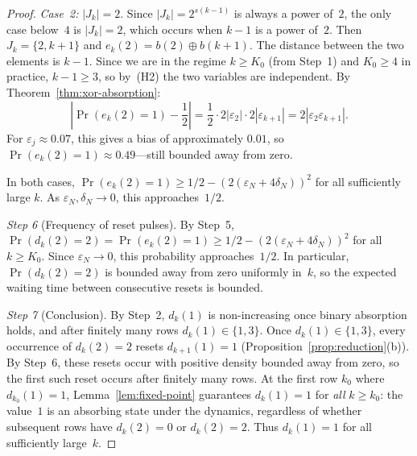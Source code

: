\documentclass[11pt, a4paper]{amsart}
\theoremstyle{plain}
\theoremstyle{definition}
\renewcommand{\Pr}{\operatorname{Pr}}
\begin{document}
\begin{proof}
\textit{Case~2:} $|J_k| = 2$. Since $|J_k| = 2^{s(k-1)}$ is always a power of~$2$, the only case
below~$4$ is $|J_k| = 2$, which occurs when $k - 1$ is a power of~$2$. Then $J_k = \{2, k+1\}$
and $e_k(2) = b(2) \oplus b(k+1)$. The distance between the two elements is $k - 1$.
Since we are in the regime $k \ge K_0$ (from Step~1) and $K_0 \ge 4$ in practice,
$k - 1 \ge 3$, so by~(H2) the two variables are independent.
By Theorem~\ref{thm:xor-absorption}:
\[
\left|\Pr(e_k(2) = 1) - \frac{1}{2}\right| = \frac{1}{2} \cdot 2|\varepsilon_2| \cdot 2|\varepsilon_{k+1}| = 2|\varepsilon_2 \varepsilon_{k+1}|.
\]
For $\varepsilon_j \approx 0.07$, this gives a bias of approximately $0.01$, so $\Pr(e_k(2) = 1) \approx 0.49$---still bounded away from zero.

In both cases, $\Pr(e_k(2) = 1) \ge 1/2 - (2(\varepsilon_N + 4\delta_N))^2$ for all sufficiently large $k$. As $\varepsilon_N, \delta_N \to 0$, this approaches~$1/2$.

\textit{Step 6} (Frequency of reset pulses). By Step~5, $\Pr(d_k(2) = 2) = \Pr(e_k(2) = 1) \ge 1/2 - (2(\varepsilon_N + 4\delta_N))^2$ for all $k \ge K_0$. 
Since $\varepsilon_N \to 0$, this probability approaches~$1/2$. In particular, $\Pr(d_k(2) = 2)$ is bounded away from zero uniformly in~$k$, 
so the expected waiting time between consecutive resets is bounded.

\textit{Step 7} (Conclusion). By Step~2, $d_k(1)$ is non-increasing once binary absorption holds, and after finitely many rows $d_k(1) \in \{1, 3\}$.
Once $d_k(1) \in \{1, 3\}$, every occurrence of $d_k(2) = 2$ resets $d_{k+1}(1) = 1$ (Proposition~\ref{prop:reduction}(b)). By Step~6,
these resets occur with positive density bounded away from zero, so the first such reset occurs after finitely many rows.
At the first row $k_0$ where $d_{k_0}(1) = 1$, Lemma~\ref{lem:fixed-point} guarantees $d_k(1) = 1$ for \emph{all} $k \ge k_0$:
the value~$1$ is an absorbing state under the dynamics, regardless of whether subsequent rows have $d_k(2) = 0$ or $d_k(2) = 2$.
Thus $d_k(1) = 1$ for all sufficiently large~$k$.
\end{proof}
\end{document}
